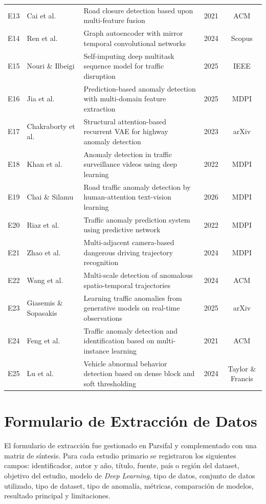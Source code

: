 \documentclass[12pt, a4paper]{article}
\begin{document}
\begin{longtable}{cp{3.2cm}p{5.0cm}cc}
E13 & Cai et al.               & Road closure detection based upon multi-feature fusion                          & 2021 & ACM \\
E14 & Ren et al.               & Graph autoencoder with mirror temporal convolutional networks                   & 2024 & Scopus \\
E15 & Nouri \& Ilbeigi         & Self-imputing deep multitask sequence model for traffic disruption              & 2025 & IEEE \\
E16 & Jia et al.               & Prediction-based anomaly detection with multi-domain feature extraction        & 2025 & MDPI \\
E17 & Chakraborty et al.       & Structural attention-based recurrent VAE for highway anomaly detection         & 2023 & arXiv \\
E18 & Khan et al.              & Anomaly detection in traffic surveillance videos using deep learning           & 2022 & MDPI \\
E19 & Chai \& Silamu           & Road traffic anomaly detection by human-attention text-vision learning         & 2026 & MDPI \\
E20 & Riaz et al.              & Traffic anomaly prediction system using predictive network                     & 2022 & MDPI \\
E21 & Zhao et al.              & Multi-adjacent camera-based dangerous driving trajectory recognition           & 2024 & MDPI \\
E22 & Wang et al.              & Multi-scale detection of anomalous spatio-temporal trajectories               & 2024 & ACM \\
E23 & Giasemis \& Sopasakis    & Learning traffic anomalies from generative models on real-time observations   & 2025 & arXiv \\
E24 & Feng et al.              & Traffic anomaly detection and identification based on multi-instance learning  & 2021 & ACM \\
E25 & Lu et al.                & Vehicle abnormal behavior detection based on dense block and soft thresholding & 2024 & Taylor \& Francis \\
\end{longtable}

\section{Formulario de Extracci\'{o}n de Datos}

El formulario de extracci\'{o}n fue gestionado en Parsifal y complementado con una matriz de s\'{i}ntesis. Para cada estudio primario se registraron los siguientes campos: identificador, autor y a\~{n}o, t\'{i}tulo, fuente, pa\'{i}s o regi\'{o}n del dataset, objetivo del estudio, modelo de \textit{Deep Learning}, tipo de datos, conjunto de datos utilizado, tipo de dataset, tipo de anomal\'{i}a, m\'{e}tricas, comparaci\'{o}n de modelos, resultado principal y limitaciones.
\end{document}
